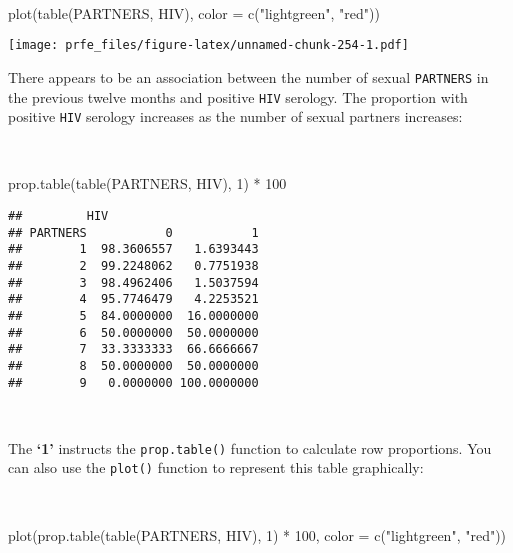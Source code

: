 \documentclass[
  12pt,
  a4paper]{book}
\newenvironment{Shaded}{\begin{snugshade}}{\end{snugshade}}
\newcommand{\AttributeTok}[1]{\textcolor[rgb]{0.77,0.63,0.00}{#1}}
\newcommand{\DecValTok}[1]{\textcolor[rgb]{0.00,0.00,0.81}{#1}}
\newcommand{\FunctionTok}[1]{\textcolor[rgb]{0.00,0.00,0.00}{#1}}
\newcommand{\NormalTok}[1]{#1}
\newcommand{\SpecialCharTok}[1]{\textcolor[rgb]{0.00,0.00,0.00}{#1}}
\newcommand{\StringTok}[1]{\textcolor[rgb]{0.31,0.60,0.02}{#1}}
\begin{document}
~

\begin{Shaded}
\begin{Highlighting}[]
\FunctionTok{plot}\NormalTok{(}\FunctionTok{table}\NormalTok{(PARTNERS, HIV), }\AttributeTok{color =} \FunctionTok{c}\NormalTok{(}\StringTok{"lightgreen"}\NormalTok{, }\StringTok{"red"}\NormalTok{))}
\end{Highlighting}
\end{Shaded}

\texttt{[image: prfe\_files/figure-latex/unnamed-chunk-254-1.pdf]}

\newpage

There appears to be an association between the number of sexual \texttt{PARTNERS} in the previous twelve months and positive \texttt{HIV} serology. The proportion with positive \texttt{HIV} serology increases as the number of sexual partners increases:

~

\begin{Shaded}
\begin{Highlighting}[]
\FunctionTok{prop.table}\NormalTok{(}\FunctionTok{table}\NormalTok{(PARTNERS, HIV), }\DecValTok{1}\NormalTok{) }\SpecialCharTok{*} \DecValTok{100}
\end{Highlighting}
\end{Shaded}

\begin{verbatim}
##         HIV
## PARTNERS           0           1
##        1  98.3606557   1.6393443
##        2  99.2248062   0.7751938
##        3  98.4962406   1.5037594
##        4  95.7746479   4.2253521
##        5  84.0000000  16.0000000
##        6  50.0000000  50.0000000
##        7  33.3333333  66.6666667
##        8  50.0000000  50.0000000
##        9   0.0000000 100.0000000
\end{verbatim}

~

The \textbf{`1'} instructs the \texttt{prop.table()} function to calculate row proportions. You can also use the \texttt{plot()} function to represent this table graphically:

~

\begin{Shaded}
\begin{Highlighting}[]
\FunctionTok{plot}\NormalTok{(}\FunctionTok{prop.table}\NormalTok{(}\FunctionTok{table}\NormalTok{(PARTNERS, HIV), }\DecValTok{1}\NormalTok{) }\SpecialCharTok{*} \DecValTok{100}\NormalTok{, }\AttributeTok{color =} \FunctionTok{c}\NormalTok{(}\StringTok{"lightgreen"}\NormalTok{, }\StringTok{"red"}\NormalTok{))}
\end{Highlighting}
\end{Shaded}
\end{document}
